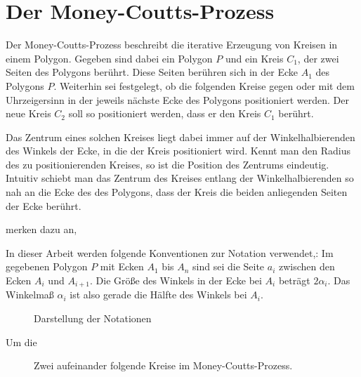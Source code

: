 \chapter{Der Money-Coutts-Prozess}

Der Money-Coutts-Prozess beschreibt die iterative Erzeugung von Kreisen in einem Polygon.
Gegeben sind dabei ein Polygon $P$ und ein Kreis $C_1$, der zwei Seiten des Polygons berührt.
Diese Seiten berühren sich in der Ecke $A_1$ des Polygons $P$.
Weiterhin sei festgelegt, ob die folgenden Kreise gegen oder mit dem Uhrzeigersinn in der jeweils nächste Ecke des Polygons positioniert werden.
Der neue Kreis $C_2$ soll so positioniert werden, dass er den Kreis $C_1$ berührt.

Das Zentrum eines solchen Kreises liegt dabei immer auf der Winkelhalbierenden des Winkels der Ecke, in die der Kreis positioniert wird.
Kennt man den Radius des zu positionierenden Kreises, so ist die Position des Zentrums eindeutig.
Intuitiv schiebt man das Zentrum des Kreises entlang der Winkelhalbierenden so nah an die Ecke des des Polygons,
dass der Kreis die beiden anliegenden Seiten der Ecke berührt.

\citet{Taba2013} merken dazu an,

In dieser Arbeit werden folgende Konventionen zur Notation verwendet,:
Im gegebenen Polygon $P$ mit Ecken $A_1$ bis $A_n$ sind sei die Seite $a_i$ zwischen den Ecken $A_i$ und $A_{i+1}$.
Die Größe des Winkels in der Ecke bei $A_i$ beträgt $2\alpha_i$.
Das Winkelmaß $\alpha_i$ ist also gerade die Hälfte des Winkels bei $A_i$.

\begin{figure}[htbp]
    
    \caption{Darstellung der Notationen}
\end{figure}

Um die

\begin{figure}[htbp]
    
    \caption{Zwei aufeinander folgende Kreise im Money-Coutts-Prozess.}
\end{figure}


